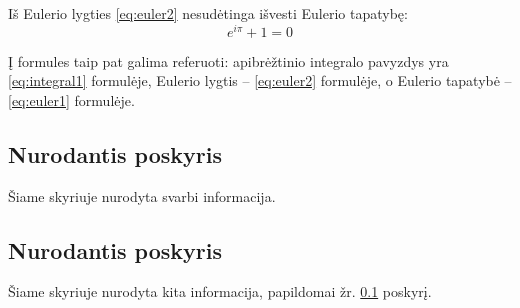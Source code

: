 \documentclass{article}
\begin{document}
Iš Eulerio lygties \eqref{eq:euler2} nesudėtinga išvesti Eulerio tapatybę:
\begin{equation}
    e^{i\pi} + 1 = 0
    \label{eq:euler1}
\end{equation}

Į formules taip pat galima referuoti: 
apibrėžtinio integralo pavyzdys yra \eqref{eq:integral1} formulėje,
Eulerio lygtis -- \eqref{eq:euler2} formulėje, 
o Eulerio tapatybė -- \eqref{eq:euler1} formulėje.

\subsection{Nurodantis poskyris}
\label{subsec:nurodantis}  %
Šiame skyriuje nurodyta svarbi informacija.

\subsection{Nurodantis poskyris} 
Šiame skyriuje nurodyta kita informacija, papildomai žr. \ref{subsec:nurodantis} poskyrį.
\end{document}
